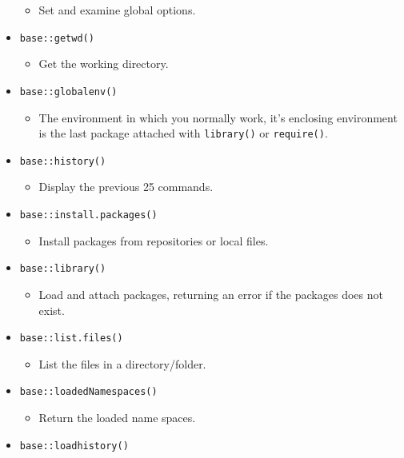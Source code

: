 \documentclass[
]{book}
\providecommand{\tightlist}{%
  \setlength{\itemsep}{0pt}\setlength{\parskip}{0pt}}
\begin{document}
\begin{itemize}
  \begin{itemize}
  \tightlist
  \item
    Set and examine global options.
  \end{itemize}
\item
  \texttt{base::getwd()}

  \begin{itemize}
  \tightlist
  \item
    Get the working directory.
  \end{itemize}
\item
  \texttt{base::globalenv()}

  \begin{itemize}
  \tightlist
  \item
    The environment in which you normally work, it's enclosing environment is the last package attached with \texttt{library()} or \texttt{require()}.
  \end{itemize}
\item
  \texttt{base::history()}

  \begin{itemize}
  \tightlist
  \item
    Display the previous 25 commands.
  \end{itemize}
\item
  \texttt{base::install.packages()}

  \begin{itemize}
  \tightlist
  \item
    Install packages from repositories or local files.
  \end{itemize}
\item
  \texttt{base::library()}

  \begin{itemize}
  \tightlist
  \item
    Load and attach packages, returning an error if the packages does not exist.
  \end{itemize}
\item
  \texttt{base::list.files()}

  \begin{itemize}
  \tightlist
  \item
    List the files in a directory/folder.
  \end{itemize}
\item
  \texttt{base::loadedNamespaces()}

  \begin{itemize}
  \tightlist
  \item
    Return the loaded name spaces.
  \end{itemize}
\item
  \texttt{base::loadhistory()}


\end{itemize}
\end{document}
